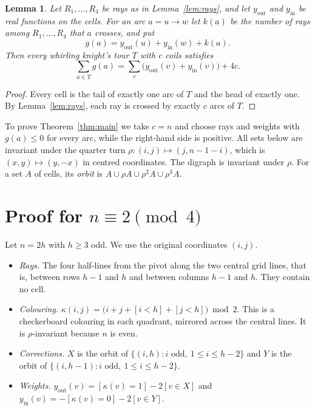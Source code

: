 \documentclass[11pt]{amsart}
\newtheorem{lemma}[theorem]{Lemma}
\theoremstyle{remark}
\newcommand{\yout}{y_{\mathrm{out}}}
\newcommand{\yin}{y_{\mathrm{in}}}
\begin{document}
\begin{lemma}\label{lem:count}
Let $R_1,\dots,R_4$ be rays as in Lemma~\ref{lem:rays}, and let $\yout$ and $\yin$ be real functions on the cells. For
an arc $a=u\to w$ let $k(a)$ be the number of rays among $R_1,\dots,R_4$ that $a$ crosses, and put
\[ g(a)=\yout(u)+\yin(w)+k(a). \]
Then every whirling knight's tour $T$ with $c$ coils satisfies
\[ \sum_{a\in T}g(a)=\sum_{v}\bigl(\yout(v)+\yin(v)\bigr)+4c. \]
\end{lemma}
\begin{proof}
Every cell is the tail of exactly one arc of $T$ and the head of exactly one. By Lemma~\ref{lem:rays}, each ray is
crossed by exactly $c$ arcs of $T$.
\end{proof}

To prove Theorem~\ref{thm:main} we take $c=n$ and choose rays and weights with $g(a)\le0$ for every arc, while the
right-hand side is positive. All sets below are invariant under the quarter turn $\rho\colon(i,j)\mapsto(j,n-1-i)$,
which is $(x,y)\mapsto(y,-x)$ in centred coordinates. The digraph is invariant under $\rho$. For a set $A$ of cells,
its \emph{orbit} is $A\cup\rho A\cup\rho^2A\cup\rho^3A$.

\section{Proof for \texorpdfstring{$n\equiv2\pmod4$}{n = 2 (mod 4)}}

Let $n=2h$ with $h\ge3$ odd. We use the original coordinates $(i,j)$.
\begin{itemize}
\item \emph{Rays.} The four half-lines from the pivot along the two central grid lines, that is, between rows $h-1$
and $h$ and between columns $h-1$ and $h$. They contain no cell.
\item \emph{Colouring.} $\kappa(i,j)=\bigl(i+j+[i<h]+[j<h]\bigr)\bmod 2$. This is a checkerboard colouring in each
quadrant, mirrored across the central lines. It is $\rho$-invariant because $n$ is even.
\item \emph{Corrections.} $X$ is the orbit of $\{(i,h): i\text{ odd},\ 1\le i\le h-2\}$ and $Y$ is the orbit of
$\{(i,h-1): i\text{ odd},\ 1\le i\le h-2\}$.
\item \emph{Weights.} $\yout(v)=[\kappa(v)=1]-2[v\in X]$ and $\yin(v)=-[\kappa(v)=0]-2[v\in Y]$.
\end{itemize}
\end{document}
